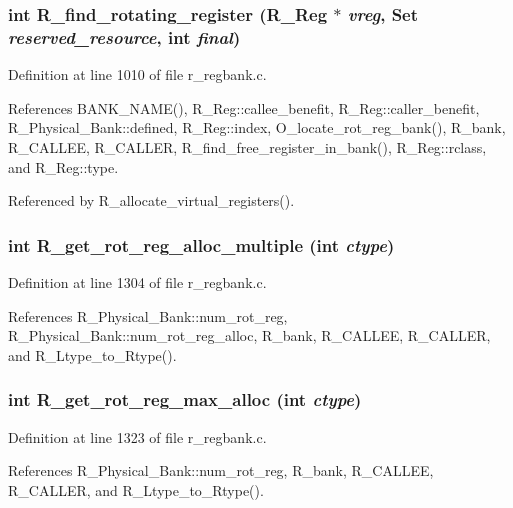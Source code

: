 \subsubsection{\setlength{\rightskip}{0pt plus 5cm}int R\_\-find\_\-rotating\_\-register (\bf{R\_\-Reg} $\ast$ {\em vreg}, \bf{Set} {\em reserved\_\-resource}, int {\em final})}\label{r__regbank_8c_497dc42cb3f4e6ac1dd09f9755ee2a2f}




Definition at line 1010 of file r\_\-regbank.c.

References BANK\_\-NAME(), R\_\-Reg::callee\_\-benefit, R\_\-Reg::caller\_\-benefit, R\_\-Physical\_\-Bank::defined, R\_\-Reg::index, O\_\-locate\_\-rot\_\-reg\_\-bank(), R\_\-bank, R\_\-CALLEE, R\_\-CALLER, R\_\-find\_\-free\_\-register\_\-in\_\-bank(), R\_\-Reg::rclass, and R\_\-Reg::type.

Referenced by R\_\-allocate\_\-virtual\_\-registers().
\subsubsection{\setlength{\rightskip}{0pt plus 5cm}int R\_\-get\_\-rot\_\-reg\_\-alloc\_\-multiple (int {\em ctype})}\label{r__regbank_8c_9b9641eecc75dfc8834ee8b71dd338cf}




Definition at line 1304 of file r\_\-regbank.c.

References R\_\-Physical\_\-Bank::num\_\-rot\_\-reg, R\_\-Physical\_\-Bank::num\_\-rot\_\-reg\_\-alloc, R\_\-bank, R\_\-CALLEE, R\_\-CALLER, and R\_\-Ltype\_\-to\_\-Rtype().
\subsubsection{\setlength{\rightskip}{0pt plus 5cm}int R\_\-get\_\-rot\_\-reg\_\-max\_\-alloc (int {\em ctype})}\label{r__regbank_8c_122cfa02ca5dbebbc80d1939c454155e}




Definition at line 1323 of file r\_\-regbank.c.

References R\_\-Physical\_\-Bank::num\_\-rot\_\-reg, R\_\-bank, R\_\-CALLEE, R\_\-CALLER, and R\_\-Ltype\_\-to\_\-Rtype().

